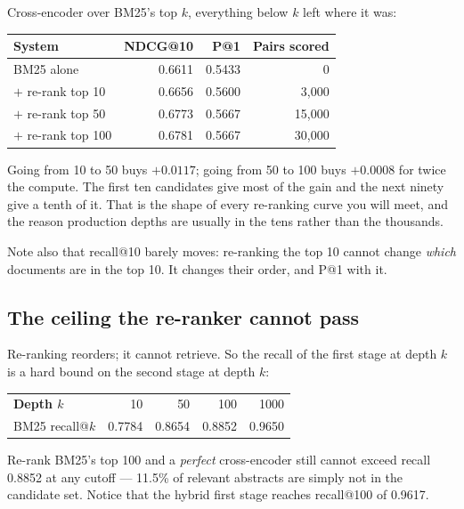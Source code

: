 \documentclass[11pt,a4paper]{article}
\begin{document}
Cross-encoder over BM25's top $k$, everything below $k$ left where it was:

\begin{center}
\small
\begin{tabular}{lrrr}
\toprule
\textbf{System} & \textbf{NDCG@10} & \textbf{P@1} & \textbf{Pairs scored} \\
\midrule
BM25 alone         & 0.6611 & 0.5433 & 0 \\
$+$ re-rank top 10  & 0.6656 & 0.5600 & 3{,}000 \\
$+$ re-rank top 50  & 0.6773 & 0.5667 & 15{,}000 \\
$+$ re-rank top 100 & 0.6781 & 0.5667 & 30{,}000 \\
\bottomrule
\end{tabular}
\end{center}

Going from 10 to 50 buys $+0.0117$; going from 50 to 100 buys $+0.0008$ for
twice the compute. The first ten candidates give most of the gain and the next
ninety give a tenth of it. That is the shape of every re-ranking curve you will
meet, and the reason production depths are usually in the tens rather than the
thousands.

Note also that recall@10 barely moves: re-ranking the top 10 cannot change
\emph{which} documents are in the top 10. It changes their order, and P@1 with
it.

\subsection{The ceiling the re-ranker cannot pass}

Re-ranking reorders; it cannot retrieve. So the recall of the first stage at
depth $k$ is a hard bound on the second stage at depth $k$:

\begin{center}
\small
\begin{tabular}{lrrrr}
\toprule
\textbf{Depth $k$}     & 10 & 50 & 100 & 1000 \\
BM25 recall@$k$        & 0.7784 & 0.8654 & 0.8852 & 0.9650 \\
\bottomrule
\end{tabular}
\end{center}

Re-rank BM25's top 100 and a \emph{perfect} cross-encoder still cannot exceed
recall 0.8852 at any cutoff --- 11.5\% of relevant abstracts are simply not in
the candidate set. Notice that the hybrid first stage reaches recall@100 of
0.9617.
\end{document}

